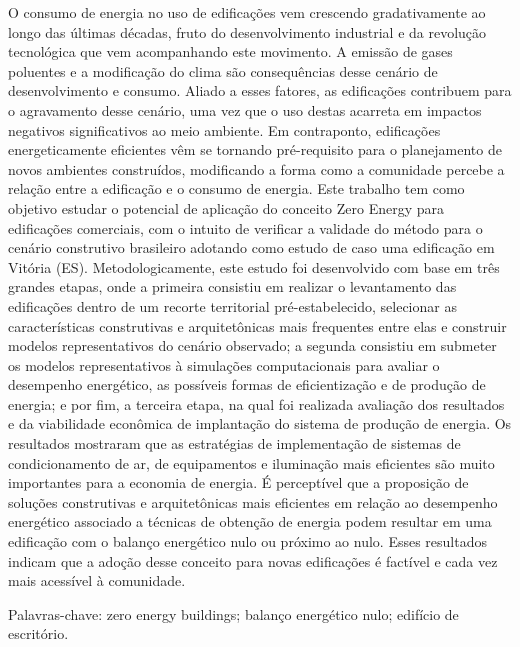\begin{resumo}
    O consumo de energia no uso de edificações vem crescendo gradativamente ao longo 
    das últimas décadas, fruto do desenvolvimento industrial e da revolução tecnológica 
    que vem acompanhando este movimento. A emissão de gases poluentes e a modificação 
    do clima são consequências desse cenário de desenvolvimento e consumo. 
    Aliado a esses fatores, as edificações contribuem para o agravamento  desse  cenário,  
    uma  vez  que  o  uso  destas  acarreta  em  impactos  negativos significativos ao 
    meio ambiente. Em contraponto, edificações energeticamente eficientes vêm se tornando  
    pré-requisito  para  o  planejamento  de  novos  ambientes  construídos,  modificando  
    a forma  como  a  comunidade  percebe  a  relação entre a edificação  e  o  consumo de  
    energia.  Este trabalho  tem  como  objetivo  estudar  o  potencial  de  aplicação  
    do  conceito Zero Energy  para edificações comerciais, com o intuito de verificar a validade 
    do método para o cenário construtivo brasileiro adotando como estudo de caso  uma 
    edificação  em Vitória (ES). Metodologicamente, este  estudo  foi  desenvolvido  com  
    base  em  três  grandes  etapas,  onde  a  primeira  consistiu  em realizar  o  
    levantamento  das  edificações  dentro  de  um  recorte  territorial  pré-estabelecido, 
    selecionar as características construtivas e arquitetônicas mais frequentes entre elas e 
    construir modelos  representativos  do  cenário  observado;  a  segunda  consistiu  
    em  submeter  os  modelos representativos à simulações computacionais para avaliar o 
    desempenho energético, as possíveis formas  de  eficientização  e  de  produção  de  
    energia;  e  por  fim,  a  terceira  etapa,  na  qual  foi realizada  avaliação  dos  
    resultados  e  da  viabilidade  econômica  de  implantação  do  sistema  de produção 
    de energia. Os resultados mostraram que as estratégias de implementação de sistemas de 
    condicionamento de ar, de equipamentos e iluminação mais eficientes são muito importantes 
    para  a  economia  de  energia.  É  perceptível  que  a  proposição  de  soluções  
    construtivas  e arquitetônicas  mais  eficientes  em  relação  ao  desempenho  energético  
    associado  a  técnicas  de obtenção  de  energia  podem  resultar  em  uma  edificação  
    com  o  balanço  energético  nulo  ou próximo ao nulo. Esses resultados indicam que a adoção 
    desse conceito para novas edificações é factível e cada vez mais acessível à comunidade. 
    
    Palavras-chave: zero energy buildings; balanço energético nulo; edifício de escritório.

\end{resumo}